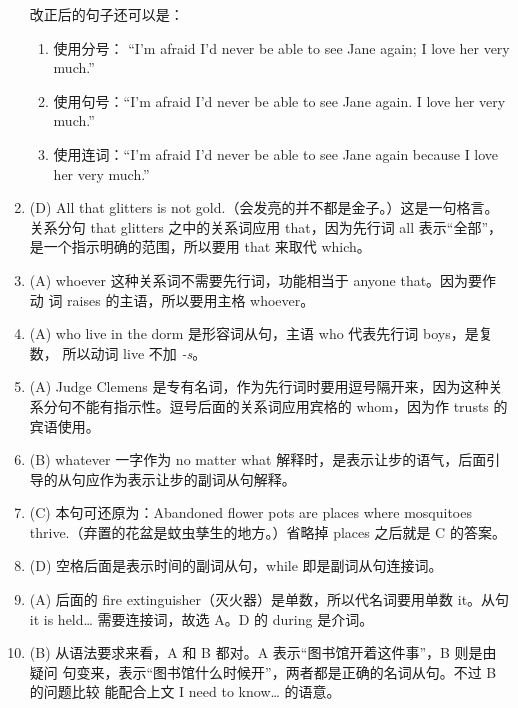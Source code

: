 \begin{enumerate}
{    改正后的句子还可以是：
    \begin{enumerate}

    \item 使用分号： “I'm afraid I'd never be able to see Jane again; I love
      her very much.”
    \item 使用句号：“I'm afraid I'd never be able to see Jane again. I love
      her very much.”
    \item 使用连词：“I'm afraid I'd never be able to see Jane again because I
      love her very much.”
    \end{enumerate}
  }

\item (D) All that glitters is not gold.（会发亮的并不都是金子。）这是一句格言。
  关系分句 that glitters 之中的关系词应用 that，因为先行词 all 表示“全部”，
  是一个指示明确的范围，所以要用 that 来取代 which。

\item (A) whoever 这种关系词不需要先行词，功能相当于 anyone that。因为要作动
  词 raises 的主语，所以要用主格 whoever。

\item  (A) who live in the dorm 是形容词从句，主语 who 代表先行词 boys，是复数， 所以动词 live 不加 \emph{-s}。
\item (A) Judge Clemens 是专有名词，作为先行词时要用逗号隔开来，因为这种关系分句不能有指示性。逗号后面的关系词应用宾格的 whom，因为作 trusts 的宾语使用。

\item (B) whatever 一字作为 no matter what 解释时，是表示让步的语气，后面引导的从句应作为表示让步的副词从句解释。

\item (C) 本句可还原为：Abandoned flower pots are places where mosquitoes thrive.（弃置的花盆是蚊虫孳生的地方。）省略掉 places 之后就是 C 的答案。


\item (D) 空格后面是表示时间的副词从句，while 即是副词从句连接词。

\item  (A) 后面的 fire extinguisher（灭火器）是单数，所以代名词要用单数 it。从句 it is held… 需要连接词，故选 A。D 的 during 是介词。
\item (B) 从语法要求来看，A 和 B 都对。A 表示“图书馆开着这件事”，B 则是由疑问
  句变来，表示“图书馆什么时候开”，两者都是正确的名词从句。不过 B 的问题比较
  能配合上文 I need to know… 的语意。
\end{enumerate}

